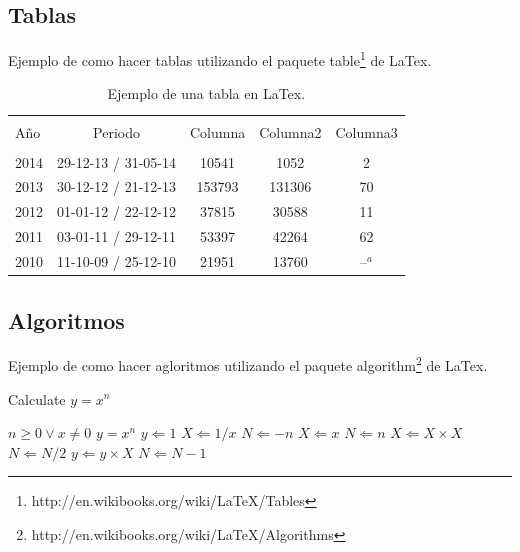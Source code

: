 \subsection{Tablas}
Ejemplo de como hacer tablas utilizando el paquete table\footnote{http://en.wikibooks.org/wiki/LaTeX/Tables} de LaTex.
\begin{table}[!htpb]
    \begin{minipage}{\textwidth}
        \begin{center}
        \caption{\label{tab:tabla-ejemplo} Ejemplo de una tabla en LaTex.}
        \begin{tabular}{p{3cm} c c c c}
            \hline\\
            Año & Periodo & Columna & Columna2 & Columna3\\
            \hline
            \hline\\
            2014 & 29-12-13 / 31-05-14 & 10541 & 1052 & 2\\
            2013 & 30-12-12 / 21-12-13 & 153793 & 131306 & 70\\
            2012 & 01-01-12 / 22-12-12 & 37815 & 30588 & 11\\
            2011 & 03-01-11 / 29-12-11 & 53397 & 42264 & 62\\
            2010 & 11-10-09 / 25-12-10 & 21951 & 13760 & --$^a$\\
        \end{tabular}
        \end{center}
    \end{minipage}
\end{table}

\subsection{Algoritmos}
Ejemplo de como hacer agloritmos utilizando el paquete algorithm\footnote{http://en.wikibooks.org/wiki/LaTeX/Algorithms} de LaTex.
\begin{algorithm}                      %
\caption{Calculate $y = x^n$}          %
\label{alg:alg1}                       %
\begin{algorithmic}                    %
    \REQUIRE $n \geq 0 \vee x \neq 0$
    \ENSURE $y = x^n$
    \STATE $y \Leftarrow 1$
        \STATE $X \Leftarrow 1 / x$
        \STATE $N \Leftarrow -n$
    \ELSE
        \STATE $X \Leftarrow x$
        \STATE $N \Leftarrow n$
    \ENDIF
            \STATE $X \Leftarrow X \times X$
            \STATE $N \Leftarrow N / 2$
        \ELSE[$N$ is odd]
            \STATE $y \Leftarrow y \times X$
            \STATE $N \Leftarrow N - 1$
        \ENDIF
    \ENDWHILE
\end{algorithmic}
\end{algorithm}

